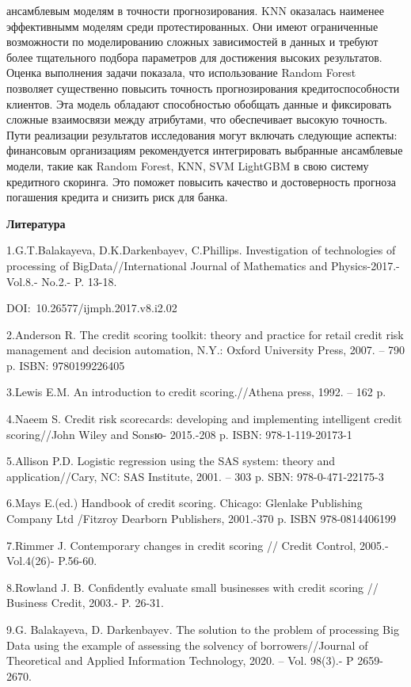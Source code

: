 ансамблевым моделям в точности прогнозирования. KNN оказалась наименее
эффективнымм моделям среди протестированных. Они имеют ограниченные
возможности по моделированию сложных зависимостей в данных и требуют
более тщательного подбора параметров для достижения высоких результатов.
Оценка выполнения задачи показала, что использование Random Forest
позволяет существенно повысить точность прогнозирования
кредитоспособности клиентов. Эта модель обладают способностью обобщать
данные и фиксировать сложные взаимосвязи между атрибутами, что
обеспечивает высокую точность. Пути реализации результатов исследования
могут включать следующие аспекты: финансовым организациям рекомендуется
интегрировать выбранные ансамблевые модели, такие как Random Forest,
KNN, SVM LightGBM в свою систему кредитного скоринга. Это поможет
повысить качество и достоверность прогноза погашения кредита и снизить
риск для банка.

{\bfseries Литература}

1.G.T.Balakayeva, D.K.Darkenbayev, C.Phillips. Investigation of
technologies of processing of BigData//International Journal of
Mathematics and Physics-2017.-Vol.8.- No.2.- P. 13-18.

DOI:~10.26577/ijmph.2017.v8.i2.02

2.Anderson R. The credit scoring toolkit: theory and practice for retail
credit risk management and decision automation, N.Y.: Oxford University
Press, 2007. -- 790 p. ISBN: 9780199226405

3.Lewis E.M. An introduction to credit scoring.//Athena press, 1992. --
162 p.

4.Naeem S. Credit risk scorecards: developing and implementing
intelligent credit scoring//John Wiley and Sonsю- 2015.-208 p. ISBN:
978-1-119-20173-1

5.Allison P.D. Logistic regression using the SAS system: theory and
application//Cary, NC: SAS Institute, 2001. -- 303 p. SBN:
978-0-471-22175-3

6.Mays E.(ed.) Handbook of credit scoring. Chicago: Glenlake Publishing
Company Ltd /Fitzroy Dearborn Publishers, 2001.-370 p. ISBN
978-0814406199

7.Rimmer J. Contemporary changes in credit scoring // Credit Control,
2005.-Vol.4(26)- P.56-60.

8.Rowland J. B. Confidently evaluate small businesses with credit
scoring // Business Credit, 2003.- P. 26-31.

9.G. Balakayeva, D. Darkenbayev. The solution to the problem of
processing Big Data using the example of assessing the solvency of
borrowers//Journal of Theoretical and Applied Information Technology,
2020. -- Vol. 98(3).- P 2659-2670.

